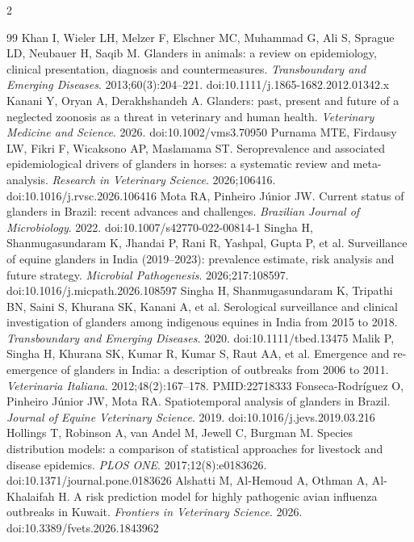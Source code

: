 \documentclass[11pt]{article}
\begin{document}
\begin{multicols}{2}
\begin{thebibliography}{99}
\footnotesize
\setlength{\itemsep}{0.15em}
\setlength{\parskip}{0pt}
 Khan I, Wieler LH, Melzer F, Elschner MC, Muhammad G, Ali S, Sprague LD, Neubauer H, Saqib M. Glanders in animals: a review on epidemiology, clinical presentation, diagnosis and countermeasures. \emph{Transboundary and Emerging Diseases}. 2013;60(3):204--221. doi:10.1111/j.1865-1682.2012.01342.x
 Kanani Y, Oryan A, Derakhshandeh A. Glanders: past, present and future of a neglected zoonosis as a threat in veterinary and human health. \emph{Veterinary Medicine and Science}. 2026. doi:10.1002/vms3.70950
 Purnama MTE, Firdausy LW, Fikri F, Wicaksono AP, Maslamama ST. Seroprevalence and associated epidemiological drivers of glanders in horses: a systematic review and meta-analysis. \emph{Research in Veterinary Science}. 2026;106416. doi:10.1016/j.rvsc.2026.106416
 Mota RA, Pinheiro J\'unior JW. Current status of glanders in Brazil: recent advances and challenges. \emph{Brazilian Journal of Microbiology}. 2022. doi:10.1007/s42770-022-00814-1
 Singha H, Shanmugasundaram K, Jhandai P, Rani R, Yashpal, Gupta P, et al. Surveillance of equine glanders in India (2019--2023): prevalence estimate, risk analysis and future strategy. \emph{Microbial Pathogenesis}. 2026;217:108597. doi:10.1016/j.micpath.2026.108597
 Singha H, Shanmugasundaram K, Tripathi BN, Saini S, Khurana SK, Kanani A, et al. Serological surveillance and clinical investigation of glanders among indigenous equines in India from 2015 to 2018. \emph{Transboundary and Emerging Diseases}. 2020. doi:10.1111/tbed.13475
 Malik P, Singha H, Khurana SK, Kumar R, Kumar S, Raut AA, et al. Emergence and re-emergence of glanders in India: a description of outbreaks from 2006 to 2011. \emph{Veterinaria Italiana}. 2012;48(2):167--178. PMID:22718333
 Fonseca-Rodr\'iguez O, Pinheiro J\'unior JW, Mota RA. Spatiotemporal analysis of glanders in Brazil. \emph{Journal of Equine Veterinary Science}. 2019. doi:10.1016/j.jevs.2019.03.216
 Hollings T, Robinson A, van Andel M, Jewell C, Burgman M. Species distribution models: a comparison of statistical approaches for livestock and disease epidemics. \emph{PLOS ONE}. 2017;12(8):e0183626. doi:10.1371/journal.pone.0183626
 Alshatti M, Al-Hemoud A, Othman A, Al-Khalaifah H. A risk prediction model for highly pathogenic avian influenza outbreaks in Kuwait. \emph{Frontiers in Veterinary Science}. 2026. doi:10.3389/fvets.2026.1843962

\end{thebibliography}
\end{multicols}
\end{document}
